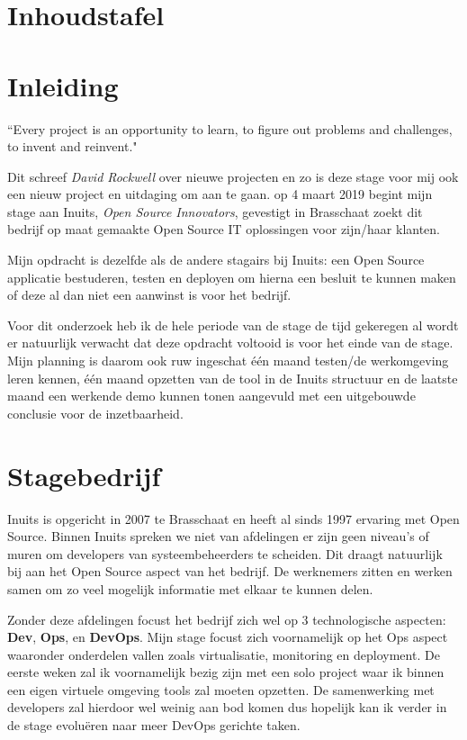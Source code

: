 \documentclass[a4paper]{article}
\def\blankpage{%
  \clearpage%
  \thispagestyle{empty}%
  \addtocounter{page}{-1}%
  \null%
\clearpage}
\begin{document}
\maketitle{}	
\newpage{}
\blankpage
{}
\section*{Inhoudstafel}
%
\renewcommand{\contentsname}{}
\tableofcontents{}
\newpage{}

\section*{Inleiding}
%
\begin{center}
``Every project is an opportunity to learn, to figure out problems and challenges, to invent and reinvent."
\end{center}
Dit schreef \textit{David Rockwell} over nieuwe projecten en zo is deze stage voor mij ook een nieuw project en uitdaging om aan te gaan.
op 4 maart 2019 begint mijn stage aan Inuits, \emph{Open Source Innovators}, gevestigt in Brasschaat zoekt dit bedrijf op maat gemaakte Open Source IT oplossingen voor zijn/haar klanten.
\par
Mijn opdracht is dezelfde als de andere stagairs bij Inuits: een Open Source applicatie bestuderen, testen en deployen om hierna een besluit te kunnen maken of deze al dan niet een aanwinst is voor het bedrijf.
\par
Voor dit onderzoek heb ik de hele periode van de stage de tijd gekeregen al wordt er natuurlijk verwacht dat deze opdracht voltooid is voor het einde van de stage.
Mijn planning is daarom ook ruw ingeschat één maand testen/de werkomgeving leren kennen, één maand opzetten van de tool in de Inuits structuur en de laatste maand een werkende demo kunnen tonen aangevuld met een uitgebouwde conclusie voor de inzetbaarheid.


\newpage{}
\section{Stagebedrijf}
Inuits is opgericht in 2007 te Brasschaat en heeft al sinds 1997 ervaring met Open Source.
Binnen Inuits spreken we niet van afdelingen er zijn geen niveau's of muren om developers van systeembeheerders te scheiden.
Dit draagt natuurlijk bij aan het Open Source aspect van het bedrijf.
De werknemers zitten en werken samen om zo veel mogelijk informatie met elkaar te kunnen delen.
\par
Zonder deze afdelingen focust het bedrijf zich wel op 3 technologische aspecten: \textbf{Dev}, \textbf{Ops}, en \textbf{DevOps}. Mijn stage focust zich voornamelijk op het Ops aspect waaronder onderdelen vallen zoals virtualisatie, monitoring en deployment. De eerste weken zal ik voornamelijk bezig zijn met een solo project waar ik binnen een eigen virtuele omgeving tools zal moeten opzetten. De samenwerking met developers zal hierdoor wel weinig aan bod komen dus hopelijk kan ik verder in de stage evoluëren naar meer DevOps gerichte taken.
\end{document}
